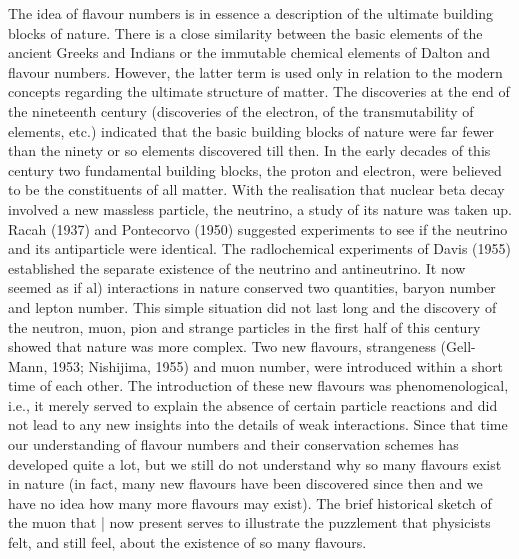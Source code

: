 \documentclass[twoside]{article}
\begin{document}
The idea of flavour numbers is in essence a description of the ultimate building blocks of nature. There is a close similarity between the
basic elements of the ancient Greeks and Indians or the immutable chemical elements of Dalton and flavour numbers. However, the latter term
is used only in relation to the modern concepts regarding the ultimate
structure of matter. The discoveries at the end of the nineteenth century (discoveries of the electron, of the transmutability of elements,
etc.) indicated that the basic building blocks of nature were far fewer
than the ninety or so elements discovered till then. In the early decades
of this century two fundamental building blocks, the proton and electron,
were believed to be the constituents of all matter. With the realisation
that nuclear beta decay involved a new massless particle, the neutrino,
a study of its nature was taken up. Racah (1937) and Pontecorvo (1950)
suggested experiments to see if the neutrino and its antiparticle were
identical. The radlochemical experiments of Davis (1955) established the
separate existence of the neutrino and antineutrino. It now seemed as
if al) interactions in nature conserved two quantities, baryon number
and lepton number. This simple situation did not last long and the
discovery of the neutron, muon, pion and strange particles in the first
half of this century showed that nature was more complex. Two new flavours, strangeness (Gell-Mann, 1953; Nishijima, 1955) and muon number,
were introduced within a short time of each other. The introduction of
these new flavours was phenomenological, i.e., it merely served to explain the absence of certain particle reactions and did not lead to any
new insights into the details of weak interactions. Since that time our
understanding of flavour numbers and their conservation schemes has developed quite a lot, but we still do not understand why so many flavours
exist in nature (in fact, many new flavours have been discovered since
then and we have no idea how many more flavours may exist). The brief
historical sketch of the muon that | now present serves to illustrate
the puzzlement that physicists felt, and still feel, about the existence
of so many flavours.
\end{document}
